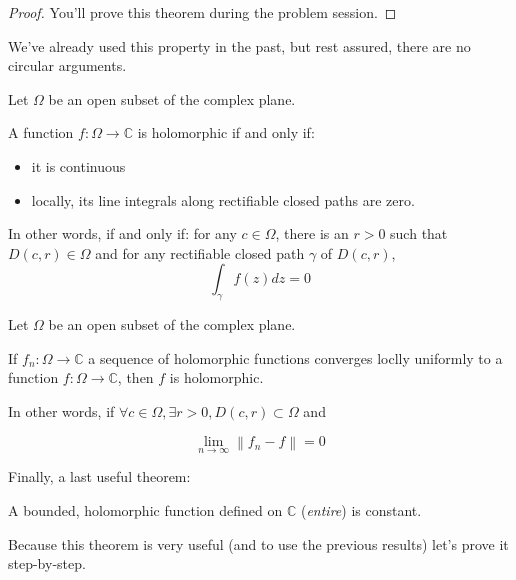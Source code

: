 \begin{proof}
    You'll prove this theorem during the problem session.
\end{proof}

\begin{note}
    We've already used this property in the past, but rest assured, there are no circular arguments.
\end{note}

\begin{thm*}
    Let $\Omega$ be an open subset of the complex plane. 

    A function $f: \Omega \rightarrow \mathbb{C}$ is holomorphic if and only if:

    \begin{itemize}
        \item it is continuous
        \item locally, its line integrals along rectifiable closed paths are zero.
    \end{itemize}

    In other words, if and only if: for any $c\in\Omega$, there is an $r > 0$ such that $D(c, r) \in \Omega$ and for any rectifiable closed path $\gamma$ of $D(c,r)$,
    $$\int_\gamma f(z)dz = 0 $$
\end{thm*}

\begin{thm*}
    Let $\Omega$ be an open subset of the complex plane. 

    If $f_n: \Omega \rightarrow \mathbb{C}$ a sequence of holomorphic functions converges loclly uniformly to a function $f: \Omega \rightarrow \mathbb{C}$, then $f$ is holomorphic.

    In other words, if $\forall c\in\Omega, \exists r > 0, D(c,r) \subset \Omega$ and 

    $$ \lim_{n\rightarrow \infty}\left\| f_n - f \right \|  = 0$$

\end{thm*}

Finally, a last useful theorem:

\begin{thm*}
    A bounded, holomorphic function defined on $\mathbb{C}$ (\emph{entire}) is constant.
\end{thm*}

Because this theorem is very useful (and to use the previous results) let's prove it step-by-step.

